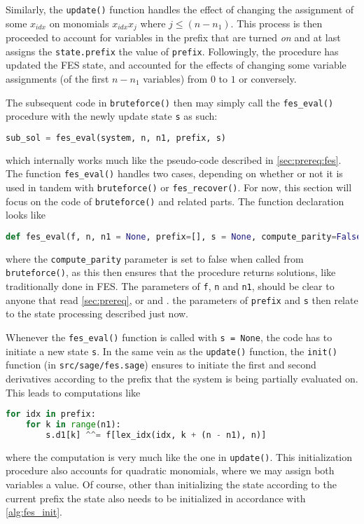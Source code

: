 Similarly, the \texttt{update()} function handles the effect of changing the assignment of some $x_{idx}$ on monomials $x_{idx}x_j$ where $j \leq (n - n_1)$. This process is then proceeded to account for variables in the prefix that are turned \textit{on} and at last assigns the \texttt{state.prefix} the value of \texttt{prefix}. Followingly, the procedure has updated the FES state, and accounted for the effects of changing some variable assignments (of the first $n - n_1$ variables) from $0$ to $1$ or conversely.

The subsequent code in \texttt{bruteforce()} then may simply call the \texttt{fes\_eval()} procedure with the newly update state \texttt{s} as such:
\begin{lstlisting}[language=Python,style=mystyle]
sub_sol = fes_eval(system, n, n1, prefix, s)
\end{lstlisting}
which internally works much like the pseudo-code described in \cref{sec:prereq:fes}. The function \texttt{fes\_eval()} handles two cases, depending on whether or not it is used in tandem with \texttt{bruteforce()} or \texttt{fes\_recover()}. For now, this section will focus on the code of \texttt{bruteforce()} and related parts. The function declaration looks like
\begin{lstlisting}[language=Python,style=mystyle]
def fes_eval(f, n, n1 = None, prefix=[], s = None, compute_parity=False):
\end{lstlisting}
where the \texttt{compute\_parity} parameter is set to false when called from \texttt{bruteforce()}, as this then ensures that the procedure returns solutions, like traditionally done in FES. The parameters of \texttt{f}, \texttt{n} and \texttt{n1}, should be clear to anyone that read \cref{sec:prereq}, or \cite{cryptoeprint:2021/578} and \cite{cryptoeprint:2013/436}. the parameters of \texttt{prefix} and \texttt{s} then relate to the state processing described just now.

Whenever the \texttt{fes\_eval()} function is called with \texttt{s = None}, the code has to initiate a new state \texttt{s}. In the same vein as the \texttt{update()} function, the \texttt{init()} function (in \texttt{src/sage/fes.sage}) ensures to initiate the first and second derivatives according to the prefix that the system is being partially evaluated on. This leads to computations like
\begin{lstlisting}[language=Python,style=mystyle]
for idx in prefix:
    for k in range(n1):
        s.d1[k] ^^= f[lex_idx(idx, k + (n - n1), n)]
\end{lstlisting}
where the computation is very much like the one in \texttt{update()}. This initialization procedure also accounts for quadratic monomials, where we may assign both variables a value. Of course, other than initializing the state according to the current prefix the state also needs to be initialized in accordance with \cref{alg:fes_init}.

